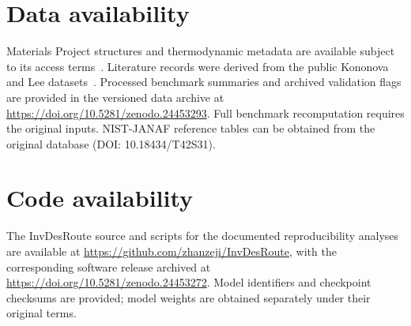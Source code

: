 \section*{Data availability}
Materials Project structures and thermodynamic metadata are available subject to its access terms~\cite{jain2013commentary}. Literature records were derived from the public Kononova and Lee datasets~\cite{kononova2019text,cedergrouphub_textmined_synthesis_public,lee2025text}. Processed benchmark summaries and archived validation flags are provided in the versioned data archive at \url{https://doi.org/10.5281/zenodo.24453293}. Full benchmark recomputation requires the original inputs. NIST-JANAF reference tables can be obtained from the original database (DOI: 10.18434/T42S31).

\section*{Code availability}
The InvDesRoute source and scripts for the documented reproducibility analyses are available at \url{https://github.com/zhanzeji/InvDesRoute}, with the corresponding software release archived at \url{https://doi.org/10.5281/zenodo.24453272}. Model identifiers and checkpoint checksums are provided; model weights are obtained separately under their original terms.
